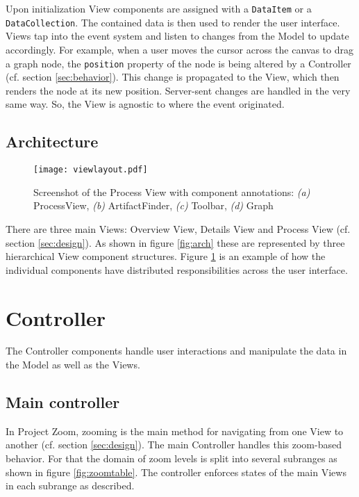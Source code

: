 Upon initialization View components are assigned with a \texttt{DataItem} or a \texttt{DataCollection}. The contained data is then used to render the user interface. Views tap into the event system and listen to changes from the Model to update accordingly. For example, when a user moves the cursor across the canvas to drag a graph node, the \texttt{position} property of the node is being altered by a Controller (cf. section \ref{sec:behavior}). This change is propagated to the View, which then renders the node at its new position. Server-sent changes are handled in the very same way. So, the View is agnostic to where the event originated.

\subsection{Architecture}

\begin{figure}
\texttt{[image: viewlayout.pdf]}
\caption[Screenshot of the Process View with component annotations]{Screenshot of the Process View with component annotations: \textit{(a)} ProcessView, \textit{(b)} ArtifactFinder, \textit{(c)} Toolbar, \textit{(d)} Graph}
\label{fig:viewlayout}
\end{figure}

There are three main Views: Overview View, Details View and Process View (cf. section \ref{sec:design}). As shown in figure \ref{fig:arch} these are represented by three hierarchical View component structures. Figure \ref{fig:viewlayout} is an example of how the individual components have distributed responsibilities across the user interface.

\section{Controller}

The Controller components handle user interactions and manipulate the data in the Model as well as the Views. 

\subsection{Main controller}
In Project Zoom, zooming is the main method for navigating from one View to another (cf. section \ref{sec:design}). The main Controller handles this zoom-based behavior. For that the domain of zoom levels is split into several subranges as shown in figure \ref{fig:zoomtable}. The controller enforces states of the main Views in each subrange as described.

